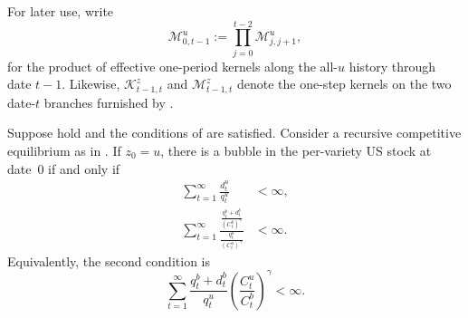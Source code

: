 \documentclass{article}
\begin{document}
For later use, write
\[
\mathcal M_{0,t-1}^u:=\prod_{j=0}^{t-2}\mathcal M_{j,j+1}^u,
\]
for the product of effective one-period kernels along the all-$u$ history through date $t-1$. Likewise, $\mathcal K_{t-1,t}^z$ and $\mathcal M_{t-1,t}^z$ denote the one-step kernels on the two date-$t$ branches furnished by .

\begin{thm}\label{thm_bubble_characterization}\label{thm_1}
Suppose  hold and the conditions of  are satisfied. Consider a recursive competitive equilibrium as in . If $z_0=u$, there is a bubble in the per-variety US stock at date~0 if and only if
\begin{subequations}\label{thm_cond1}
\begin{align}
\sum_{t=1}^\infty \frac{d_t^u}{q_t^u}&<\infty, \label{thm_cond_1a}\\
\sum_{t=1}^\infty
\frac{\frac{q_t^b+d_t^b}{(C_t^b)^\gamma}}{\frac{q_t^u}{(C_t^u)^\gamma}}&<\infty. \label{thm_cond_1b}
\end{align}
\end{subequations}
Equivalently, the second condition is
\[
\sum_{t=1}^\infty
\frac{q_t^b+d_t^b}{q_t^u}
\left(\frac{C_t^u}{C_t^b}\right)^\gamma
<\infty.
\]
\end{thm}
\end{document}
